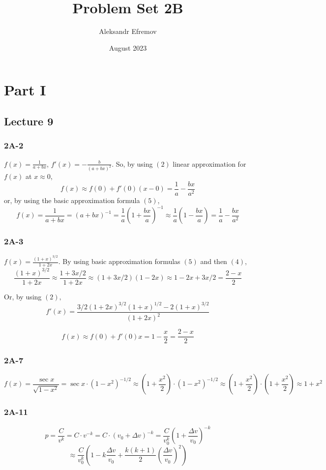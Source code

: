 \documentclass{article}
\title{Problem Set 2B}
\author{Aleksandr Efremov}
\date{August 2023}
\begin{document}
\maketitle

\section{Part I}
\subsection{Lecture 9}
\subsubsection{2A-2}

$f(x) = \frac{1}{a+bx}$, $f'(x) = -\frac{b}{(a+bx)^2}$. So, by using $(2)$ linear approximation for $f(x)$ at $x \approx 0$,
\[ f(x) \approx f(0) + f'(0)(x-0) = \frac{1}{a} - \frac{bx}{a^2} \]
or, by using the basic approximation formula $(5)$,
\[ f(x) = \frac{1}{a+bx} = (a+bx)^{-1} = \frac{1}{a} \left( 
1+\frac{bx}{a} \right)^{-1} \approx \frac{1}{a} \left( 1 - \frac{bx}{a} \right) = \frac{1}{a} - \frac{bx}{a^2} \]

\subsubsection{2A-3}
$f(x) = \frac{(1+x)^{3/2}}{1+2x}$. By using basic approximation formulas $(5)$ and then $(4)$,
\[ \frac{(1+x)^{3/2}}{1+2x} \approx \frac{1+3x/2}{1+2x} \approx (1+3x/2)(1-2x) \approx 1 - 2x + 3x/2  = \frac{2-x}{2}\]

Or, by using $(2),$
\[ f'(x) = \frac{3/2(1+2x)^{3/2}(1+x)^{1/2}-2(1+x)^{3/2}}{(1+2x)^2} \]

\[ f(x) \approx f(0) + f'(0)x = 1 - \frac{x}{2} = \frac{2-x}{2}\]

\subsubsection{2A-7}

\[ f(x) = \frac{\sec{x}}{\sqrt{1-x^2}} = \sec{x} \cdot (1-x^2)^{-1/2} \approx \left( 1+\frac{x^2}{2} \right) \cdot (1-x^2)^{-1/2} \approx \left( 1+\frac{x^2}{2} \right) \cdot \left(1+\frac{x^2}{2} \right) \approx 1+x^2 \]

\subsubsection{2A-11}
\[ p = \frac{C}{v^k} = C \cdot v^{-k} = C \cdot (v_0 + \Delta v)^{-k} = \frac{C}{v_0^k} \left( 1 + \frac{\Delta v}{v_0} \right)^{-k} \]
\[ \approx \frac{C}{v_0^k} \left( 1 - k\frac{\Delta v}{v_0} + \frac{k(k+1)}{2} \left( \frac{\Delta v}{v_0} \right)^2 \right) \]
\end{document}
